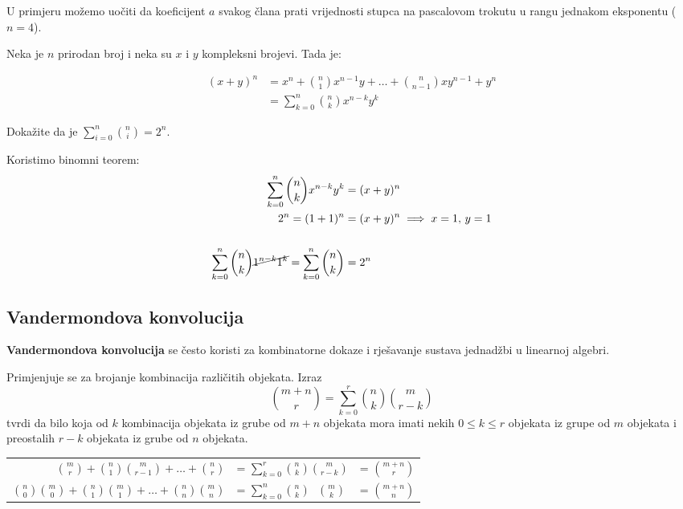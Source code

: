 U primjeru možemo uočiti da koeficijent $a$ svakog člana prati vrijednosti
stupca na pascalovom trokutu u rangu jednakom eksponentu ($n=4$).

\begin{theorem}
    Neka je $n$ prirodan broj i neka su $x$ i $y$ kompleksni brojevi. Tada je:

    \begin{align*}
        (x+y)^n &= x^n + \binom{n}{1}x^{n-1}y+\dots+\binom{n}{n-1}xy^{n-1}+y^n\\
        &=\sum_{k=0}^{n} \binom{n}{k} x^{n-k} y^k
    \end{align*}
\end{theorem}

\begin{problem}
    Dokažite da je $\displaystyle\sum_{i=0}^{n} \binom{n}{i} = 2^n$.
\end{problem}

Koristimo binomni teorem:
\begin{align*}
    \sum_{k=0}^{n} \binom{n}{k} x^{n-k} y^k &= (x+y)^n\\
    2^n = (1+1)^n &= (x+y)^n \implies x=1,\, y=1\\
    \\
    \sum_{k=0}^{n} \binom{n}{k} \cancel{1^{n-k} 1^k} = \sum_{k=0}^{n} \binom{n}{k} &= 2^n
\end{align*}

\subsection{Vandermondova konvolucija}
\textbf{Vandermondova konvolucija} se često koristi za kombinatorne dokaze i
rješavanje sustava jednadžbi u linearnoj algebri.

Primjenjuje se za brojanje kombinacija različitih objekata. Izraz
$$
    \binom{m+n}{r} = \sum_{k=0}^{r} \binom{n}{k}\binom{m}{r-k}
$$
tvrdi da bilo koja od $k$ kombinacija objekata iz grube od $m+n$ objekata mora
imati nekih $0 \leq k \leq r$ objekata iz grupe od $m$ objekata i preostalih $r-k$
objekata iz grube od $n$ objekata.

\begin{theorem}
    \center
    \begin{tabular}{rll}
        $\displaystyle\binom{m}{r}+\binom{n}{1}\binom{m}{r-1}+\dots+\binom{n}{r}$ &= $\displaystyle\sum_{k=0}^{r} \binom{n}{k}\binom{m}{r-k}$ &= $\displaystyle\binom{m+n}{r}$\\
        $\displaystyle\binom{n}{0}\binom{m}{0}+\binom{n}{1}\binom{m}{1}+\dots+\binom{n}{n}\binom{m}{n}$ &= $\displaystyle\sum_{k=0}^{n} \binom{n}{k}\enspace\,\binom{m}{k}$ &= $\displaystyle\binom{m+n}{n}$
    \end{tabular}
\end{theorem}

